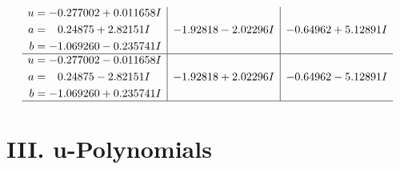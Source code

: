 \documentclass[1p]{elsarticle_modified}
\theoremstyle{definition}
\begin{document}
$$\begin{array}{c|c|c}
\begin{aligned}
u &= -0.277002 + 0.011658 I \\
a &= \phantom{-}0.24875 + 2.82151 I \\
b &= -1.069260 - 0.235741 I\end{aligned}
 & -1.92818 - 2.02296 I & -0.64962 + 5.12891 I \\ \hline\begin{aligned}
u &= -0.277002 - 0.011658 I \\
a &= \phantom{-}0.24875 - 2.82151 I \\
b &= -1.069260 + 0.235741 I\end{aligned}
 & -1.92818 + 2.02296 I & -0.64962 - 5.12891 I\\
 \hline 
 \end{array}$$\newpage
\newpage\renewcommand{\arraystretch}{1}
\centering \section*{ III. u-Polynomials}
\end{document}

